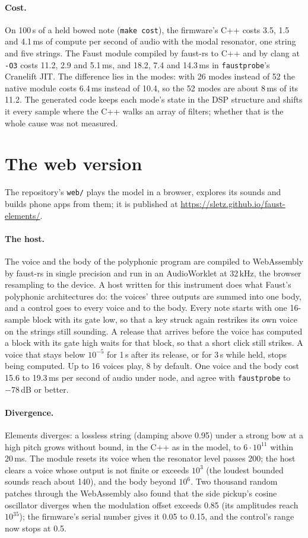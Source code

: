 \documentclass[10pt,a4paper,twocolumn]{article}
\newcommand{\faustrs}{faust-rs}
\newcommand{\probe}{\texttt{faustprobe}}
\newcommand{\code}[1]{\texttt{#1}}
\begin{document}
\paragraph{Cost.} On 100\,s of a held bowed note (\code{make cost}), the firmware's C++ costs 3.5, 1.5 and 4.1\,ms of compute per second of audio with the modal resonator, one string and five strings. The Faust module compiled by \faustrs{} to C++ and by clang at \code{-O3} costs 11.2, 2.9 and 5.1\,ms, and 18.2, 7.4 and 14.3\,ms in \probe{}'s Cranelift JIT. The difference lies in the modes: with 26 modes instead of 52 the native module costs 6.4\,ms instead of 10.4, so the 52 modes are about 8\,ms of its 11.2. The generated code keeps each mode's state in the DSP structure and shifts it every sample where the C++ walks an array of filters; whether that is the whole cause was not measured.

\section{The web version}
\label{sec:web}

The repository's \code{web/} plays the model in a browser, explores its sounds and builds phone apps from them; it is published at \url{https://sletz.github.io/faust-elements/}.

\paragraph{The host.} The voice and the body of the polyphonic program are compiled to WebAssembly by \faustrs{} in single precision and run in an AudioWorklet at 32\,kHz, the browser resampling to the device. A host written for this instrument does what Faust's polyphonic architectures do: the voices' three outputs are summed into one body, and a control goes to every voice and to the body. Every note starts with one 16-sample block with its gate low, so that a key struck again restrikes its own voice on the strings still sounding. A release that arrives before the voice has computed a block with its gate high waits for that block, so that a short click still strikes. A voice that stays below $10^{-5}$ for 1\,s after its release, or for 3\,s while held, stops being computed. Up to 16 voices play, 8 by default. One voice and the body cost 15.6 to 19.3\,ms per second of audio under node, and agree with \probe{} to $-78$\,dB or better.

\paragraph{Divergence.} Elements diverges: a lossless string (damping above 0.95) under a strong bow at a high pitch grows without bound, in the C++ as in the model, to $6\cdot10^{11}$ within 20\,ms. The module resets its voice when the resonator level passes 200; the host clears a voice whose output is not finite or exceeds $10^3$ (the loudest bounded sounds reach about 140), and the body beyond $10^6$. Two thousand random patches through the WebAssembly also found that the side pickup's cosine oscillator diverges when the modulation offset exceeds 0.85 (its amplitudes reach $10^{35}$); the firmware's serial number gives it 0.05 to 0.15, and the control's range now stops at 0.5.
\end{document}
